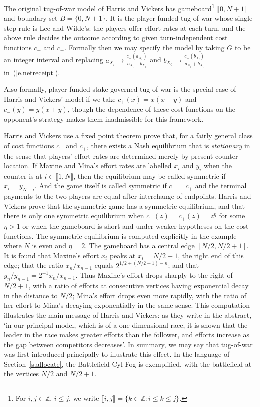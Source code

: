 \documentclass[letterpaper,11pt,oneside,reqno]{amsbook}
\newcommand{\Z}{\ensuremath{\mathbb{Z}}}
\numberwithin{figure}{chapter}
\theoremstyle{definition}
\theoremstyle{definition}
\theoremstyle{definition}
\theoremstyle{definition}
\theoremstyle{definition}
\newcommand{\intint}[1]{\llbracket 1,#1 \rrbracket}
\def\hfff#1{\label{#1}}
\begin{document}
 
 The original tug-of-war model of Harris and Vickers has gameboard\footnote{For $i,j \in \Z$, $i \leq j$, we write \hfff{intint}$\llbracket i,j \rrbracket = \big\{ k \in \Z: i \leq k \leq j \big\}$.} $\llbracket 0, N+1\rrbracket$ and boundary set $B = \{0,N+1\}$.
 It is the player-funded tug-of-war whose single-step rule is Lee and Wilde's: the players offer effort rates at each turn, and the above rule decides the outcome according to given turn-independent
 cost functions $c_-$ and $c_+$. Formally then we may specify the model by taking $G$ to be an integer interval and replacing $a_{X_i} \to \tfrac{c_+(a_{X_i})}{a_{X_i}+b_{X_i}}$ and  $b_{X_0} \to \tfrac{c_-(b_{X_i})}{a_{X_i}+b_{X_i}}$  in~(\ref{e.netreceipt}).
 
 
Also formally, player-funded stake-governed tug-of-war is the special case of Harris and Vickers' model if we take $c_+(x) = x(x+y)$ and $c_-(y) = y(x+y)$, though the dependence of these cost functions on the opponent's strategy makes them inadmissible for this framework.

Harris and Vickers use a fixed point theorem prove that, for a fairly general class of cost functions $c_-$ and $c_+$, there exists a Nash equilibrium that is {\em stationary} in the sense that  players' effort rates are determined merely by present counter location. If Maxine and Mina's effort rates are labelled $x_i$ and $y_i$ when the counter is at $i \in \intint{N}$, then the equilibrium may be called symmetric if $x_i = y_{N - i}$.
And the game itself is called symmetric if $c_- = c_+$ and the terminal payments to the two players are equal after interchange of endpoints.
Harris and Vickers prove that the symmetric game has a symmetric equilibrium, and that there is only one symmetric equilibrium when $c_-(z) = c_+(z) = z^\eta$ for some $\eta > 1$ or when the gameboard is short and under weaker hypotheses on the cost functions. The symmetric equilibrium is computed explicitly in the example where $N$ is even and $\eta =2$. 
The gameboard has a central edge $[N/2,N/2+1]$. 
It is found that 
Maxine's effort $x_i$ peaks at $x_i = N/2+1$, the right end of this edge; that the ratio $x_n/x_{n-1}$ equals $2^{1/2 + (N/2 +1) - n}$; and that $y_n/y_{n-1} = 2^{-1} x_n/x_{n-1}$.
Thus Maxine's effort drops sharply to the right of $N/2 +1$, with a ratio of efforts at consecutive vertices having exponential decay in the distance to $N/2$; Mina's effort drops even more rapidly, with the ratio of her effort to Mina's decaying exponentially in the same sense. This computation illustrates the main message of Harris and Vickers: as they write in the abstract, `in our principal model, which is of a one-dimensional race, it is shown that the leader in the race makes greater efforts than the follower, and efforts increase as the gap between competitors decreases'. In summary, we may say that tug-of-war was first introduced principally to illustrate this effect. In the language of Section~\ref{s.allocate}, the Battlefield Cyl Fog is exemplified, with the battlefield at the vertices $N/2$ and $N/2 +1$.
\end{document}
